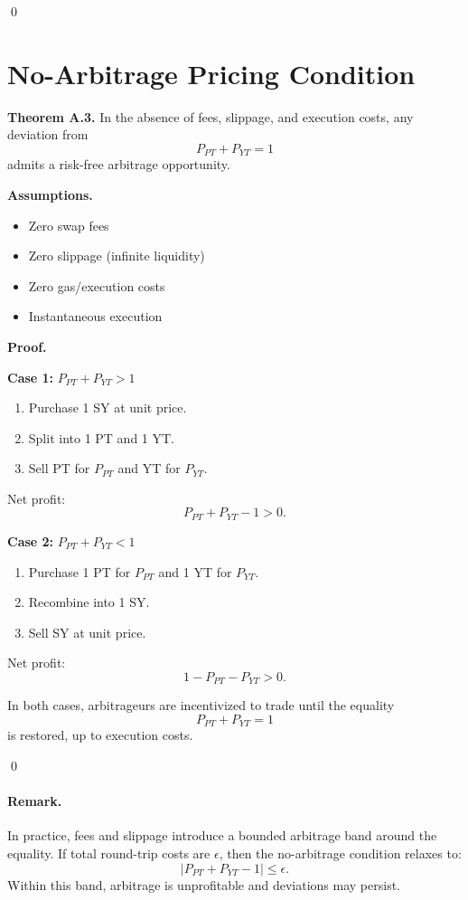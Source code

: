 \qed


\section{No-Arbitrage Pricing Condition}

\textbf{Theorem A.3.}
In the absence of fees, slippage, and execution costs, any deviation from
\[
P_{PT} + P_{YT} = 1
\]
admits a risk-free arbitrage opportunity.

\textbf{Assumptions.}
\begin{itemize}
\item Zero swap fees
\item Zero slippage (infinite liquidity)
\item Zero gas/execution costs
\item Instantaneous execution
\end{itemize}

\textbf{Proof.}

\textbf{Case 1:} $P_{PT} + P_{YT} > 1$

\begin{enumerate}
\item Purchase 1 SY at unit price.
\item Split into 1 PT and 1 YT.
\item Sell PT for $P_{PT}$ and YT for $P_{YT}$.
\end{enumerate}

Net profit:
\[
P_{PT} + P_{YT} - 1 > 0.
\]

\textbf{Case 2:} $P_{PT} + P_{YT} < 1$

\begin{enumerate}
\item Purchase 1 PT for $P_{PT}$ and 1 YT for $P_{YT}$.
\item Recombine into 1 SY.
\item Sell SY at unit price.
\end{enumerate}

Net profit:
\[
1 - P_{PT} - P_{YT} > 0.
\]

In both cases, arbitrageurs are incentivized to trade until the equality
\[
P_{PT} + P_{YT} = 1
\]
is restored, up to execution costs.

\qed

\paragraph{Remark.}
In practice, fees and slippage introduce a bounded arbitrage band around the equality. If total round-trip costs are $\epsilon$, then the no-arbitrage condition relaxes to:
\[
|P_{PT} + P_{YT} - 1| \le \epsilon.
\]
Within this band, arbitrage is unprofitable and deviations may persist.

